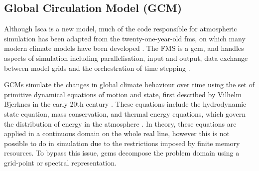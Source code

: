 \documentclass[a4paper,11pt]{report}
\begin{document}
\subsection{Global Circulation Model (GCM)}
Although Isca is a new model, much of the code responsible for atmospheric simulation has been adapted from the twenty-one-year-old \gls{fms}, on which many modern climate models have been developed \cite{balaji2002fms, donner2011dynamical, farneti2009intermediate}. The FMS is a \gls{gcm}, and handles aspects of simulation including parallelisation, input and output, data exchange between model grids and the orchestration of time stepping \cite{gfdl2019fms}.
\par
GCMs simulate the changes in global climate behaviour over time using the set of primitive dynamical equations of motion and state, first described by Vilhelm Bjerknes in the early 20th century \cite{bjerknes1910dynamic,edwards2011history, godske1957dynamic}. These equations include the hydrodynamic state equation, mass conservation, and thermal energy equations, which govern the distribution of energy in the atmosphere \cite{vallis2018isca,edwards2011history}. In theory, these equations are applied in a continuous domain on the whole real line, however this is not possible to do in simulation due to the restrictions imposed by finite memory resources. To bypass this issue, \gls{gcm}s decompose the problem domain using a grid-point or spectral representation.
\end{document}
